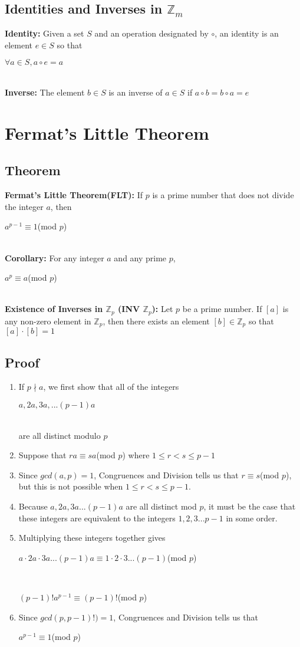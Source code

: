 \documentclass[12pt]{report}
\begin{document}
		\subsection{Identities and Inverses in $\mathbb{Z}_m$}
			\textbf{Identity:} Given a set $S$ and an operation designated by $\circ$, an identity is an element $e \in S$ so that \\
			\centerline{$\forall a \in S, a \circ e = a$}\\
			\textbf{Inverse:} The element $b \in S$ is an inverse of $a \in S$ if $a \circ b = b \circ a = e$
	\section{Fermat's Little Theorem}
		\subsection{Theorem}
			\textbf{Fermat's Little Theorem(FLT):} If $p$ is a prime number that does not divide the integer $a$, then \\
			\centerline{$a^{p-1} \equiv 1$(mod $p$)}\\
			\textbf{Corollary:} For any integer $a$ and any prime $p$, \\
			\centerline{$a^p \equiv a$(mod $p$)}\\
			\textbf{Existence of Inverses in $\mathbb{Z}_p$ (INV $\mathbb{Z}_p$):} Let $p$ be a prime number. If $[a]$ is any non-zero element in $\mathbb{Z}_p$, then there exists an element $[b] \in \mathbb{Z}_p$ so that $[a] \cdot [b] = 1$
		\subsection{Proof}
			\begin{enumerate}
				\item If $p \nmid a$, we first show that all of the integers \\
				\centerline{$a, 2a, 3a, ... (p-1)a$}\\
				are all distinct modulo $p$
				\item Suppose that $ra \equiv sa$(mod $p$) where $1 \leq r < s \leq p-1$
				\item Since $gcd(a,p) = 1$, Congruences and Division tells us that $r \equiv s$(mod $p$), but this is not possible when $1 \leq r < s \leq p-1$.
				\item Because $a, 2a, 3a... (p-1)a$ are all distinct mod $p$, it must be the case that these integers are equivalent to the integers $1,2,3... p-1$ in some order.
				\item Multiplying these integers together gives\\
				\centerline{$a\cdot 2a \cdot 3a ... (p-1)a \equiv 1 \cdot 2 \cdot 3 ... (p-1)$(mod $p$)}\\
				\centerline{$(p-1)!a^{p-1} \equiv (p-1)!$(mod $p$)}
				\item Since $gcd(p,p-1)!) = 1$, Congruences and Division tells us that \\
				\centerline{$a^{p-1} \equiv 1$(mod $p$)}
			\end{enumerate}
\end{document}
